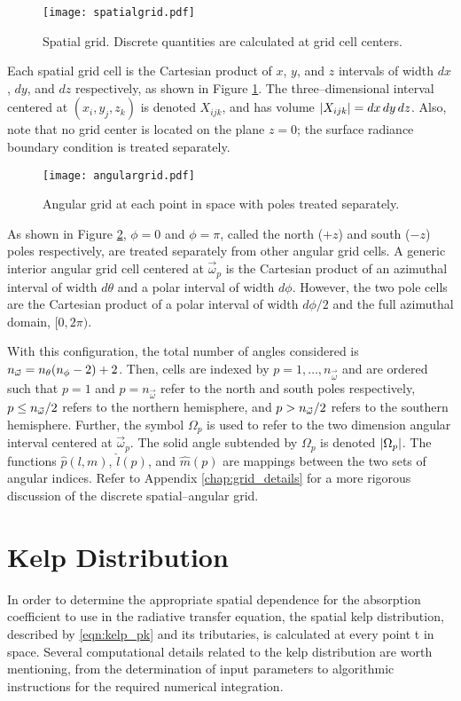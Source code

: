 \begin{figure}[H]
  \centering
  \texttt{[image: spatialgrid.pdf]}
  \caption{Spatial grid. Discrete quantities are calculated at grid cell centers.}
  \label{fig:spatial_grid}
\end{figure}

Each spatial grid cell is the Cartesian product of $x$, $y$, and $z$ intervals of width $dx$, $dy$, and $dz$ respectively,
as shown in Figure \ref{fig:spatial_grid}.
The three--dimensional interval centered at $(x_i, y_j, z_k)$ is denoted $X_{ijk}$, and has volume $\left| X_{ijk} \right|=dx\,dy\,dz$.
Also, note that no grid center is located on the plane $z=0$; the surface radiance boundary condition is treated separately.

\begin{figure}[H]
  \centering
  \texttt{[image: angulargrid.pdf]}
  \caption{Angular grid at each point in space with poles treated separately.}
  \label{fig:angular_grid}
\end{figure}

As shown in Figure \ref{fig:angular_grid}, $\phi=0$ and $\phi=\pi$, called
the north ($+z$) and south ($-z$) poles respectively, are treated separately from other angular grid cells.
A generic interior angular grid cell centered at $\vec{\omega}_p$ is the Cartesian product of an azimuthal interval of width $d\theta$ and a polar interval of width $d\phi$.
However, the two pole cells are the Cartesian product of a polar interval of width $d\phi/2$ and the full azimuthal domain, $[0, 2\pi)$.

With this configuration, the total number of angles considered is ${n_{\vec{\omega}}} = n_\theta(n_\phi-2)+2$.
Then, cells are indexed by $p=1,\ldots,n_{\vec{\omega}}$ and are ordered such that
$p=1$ and $p=n_{\vec{\omega}}$ refer to the north and south poles respectively,
$p\leq{n_{\vec{\omega}}}/2$ refers to the northern hemisphere, and $p>{n_{\vec{\omega}}}/2$ refers to the southern hemisphere.
Further, the symbol $\Omega_p$ is used to refer to the two dimension angular interval centered at $\vec{\omega}_p$.
The solid angle subtended by $\Omega_p$ is denoted $\left| \Omega_p \right|$.
The functions $\hat{p}(l,m)$, $\hat{l}(p)$, and $\hat{m}(p)$ are mappings between the two sets of angular indices.
Refer to Appendix \ref{chap:grid_details} for a more rigorous discussion of the discrete spatial--angular grid.

\section{Kelp Distribution}
In order to determine the appropriate spatial dependence for the absorption coefficient to use in the radiative transfer equation, the spatial kelp distribution, described by \eqref{eqn:kelp_pk} and its tributaries, is calculated at every point t in space.
Several computational details related to the kelp distribution are worth mentioning, from the determination of input parameters to algorithmic instructions for the required numerical integration.

